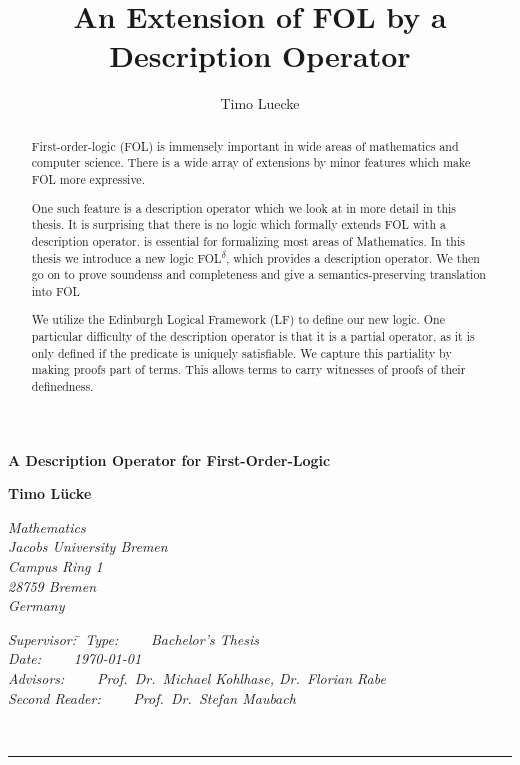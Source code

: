 \documentclass{article}
\title{An Extension of FOL by a Description Operator}
\author{Timo Luecke}
\begin{document}
  \thispagestyle{empty}

  \begin{flushleft}
    \textbf{\huge A Description Operator for First-Order-Logic}
  \end{flushleft}
  \vspace*{6mm}
  \begin{flushleft}
    \textbf{\large Timo L\"ucke}\\[2ex]
  \end{flushleft}
  \vspace*{1mm}
  \begin{flushleft}
    \textit{Mathematics \\
      Jacobs University Bremen \\
      Campus Ring 1 \\
      28759 Bremen \\
      Germany}
  \end{flushleft}
  \vspace*{6mm}
  \begin{tabbing}
    \textit{Supervisor:} \= \kill
    \textit{Type:} \> \ \ \ \ \textit{Bachelor's Thesis}\\
    \textit{Date:} \> \ \ \ \ \textit{\today} \\
    \textit{Advisors:} \> \ \ \ \ \textit{Prof.\ Dr.\ Michael Kohlhase, Dr.\ Florian Rabe}\\
    \textit{Second Reader:} \> \ \ \ \ \textit{Prof.\ Dr.\ Stefan Maubach}\\
  \end{tabbing}
  \vspace*{2mm}
  ~\hrule

\clearpage


\begin{abstract}
First-order-logic (FOL) is immensely important in wide areas of mathematics and computer science. There is a wide array of extensions by minor features which make FOL more expressive.

One such feature is a description operator which we look at in more detail in this thesis. It is surprising that there is no logic which formally extends FOL with a description operator. is essential for formalizing most areas of Mathematics. In this thesis we introduce a new logic FOL\textsuperscript{$\delta$}, which provides a description operator. We then go on to prove soundenss and completeness and give a semantics-preserving translation into FOL

We utilize the Edinburgh Logical Framework (LF) to define our new logic. One particular difficulty of the description operator is that it is a partial operator, as it is only defined if the predicate is uniquely satisfiable. We capture this partiality by making proofs part of terms. This allows terms to carry witnesses of proofs of their definedness.
\end{abstract}
\end{document}
